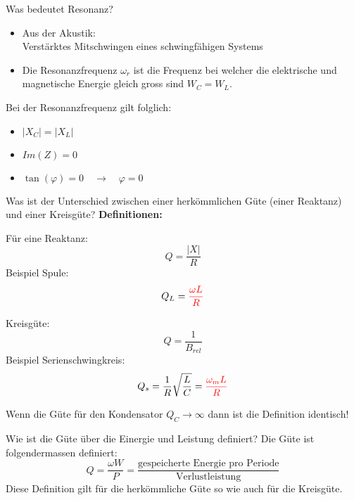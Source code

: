 \begin{karte}{Was bedeutet Resonanz?}
	\begin{itemize}
		\item Aus der Akustik:\\
		Verstärktes Mitschwingen eines schwingfähigen Systems
		\item Die Resonanzfrequenz $\omega_r$ ist die Frequenz bei welcher die elektrische und magnetische Energie gleich gross sind $W_C = W_L$.
	\end{itemize}
	Bei der Resonanzfrequenz gilt folglich:
	\begin{itemize}
		\item $|X_C| = |X_L|$
		\item $Im(Z) = 0$
		\item $\tan (\varphi) = 0 \quad \rightarrow \quad \varphi = 0$
	\end{itemize}
\end{karte}

\begin{karte}{Was ist der Unterschied zwischen einer herkömmlichen Güte (einer Reaktanz) und einer Kreisgüte?}
	\textbf{Definitionen:}\\
	\begin{minipage}[t]{0.48\textwidth}
		Für eine Reaktanz:
		\begin{equation*}
			Q = \frac{|X|}{R}
		\end{equation*}
		Beispiel Spule:
		\begin{equation*}
			Q_L = \color{red}\frac{\omega L}{R}
		\end{equation*}
		\scalebox{.7}{}
	\end{minipage}
	\begin{minipage}[t]{0.48\textwidth}
		Kreisgüte:
		\begin{equation*}
			Q = \frac{1}{B_{rel}}
		\end{equation*}
		Beispiel Serienschwingkreis:
		\begin{equation*}
			Q_s = \frac{1}{R} \sqrt{\frac{L}{C}} = \color{red}\frac{\omega_m L}{R}
		\end{equation*}
		\scalebox{.7}{}
	\end{minipage}

	Wenn die Güte für den Kondensator $Q_C \rightarrow \infty$ dann ist die Definition identisch!
\end{karte}

\begin{karte}{Wie ist die Güte über die Einergie  und Leistung definiert?}
	Die Güte ist folgendermassen definiert:
	\begin{equation*}
		Q=\frac{\omega W}{P} = \frac{\text{gespeicherte Energie pro Periode}}{\text{Verlustleistung}}
	\end{equation*}
	Diese Definition gilt für die herkömmliche Güte so wie auch für die Kreisgüte.
\end{karte}

